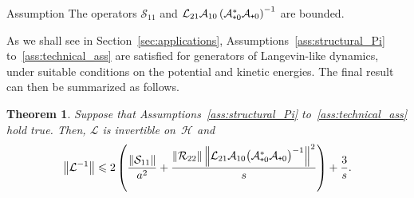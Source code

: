 \documentclass[10pt]{amsart}
\newtheorem{theo}{Theorem}[section]
\theoremstyle{definition}\newtheorem{defi}[theo]{Definition}\newtheorem{rema}[theo]{Remark}\newtheorem{exam}[theo]{Example}\newtheorem{exem}[theo]{Example}\newtheorem{nota}[theo]{Notation}
\newcommand{\cL}{\mathcal{L}}
\newcommand{\cLs}{\mathcal{S}}
\newcommand{\cLa}{\mathcal{A}}
\newcommand{\cR}{\mathcal{R}}
\newcommand{\cH}{\mathcal{H}}
\newcommand{\subplus}{\textnormal{\texttt{+}}}
\renewcommand{\leq}{\leqslant}
\begin{document}
\begin{enonce}{Assumption}\label{ass:technical_ass}
The operators $\cLs_{11}$ and $\cL_{21}\cLa_{10}\left(\cLa_{\subplus0}^* \cLa_{\subplus0}\right)^{-1}$ are bounded.
\end{enonce}

As we shall see in Section~\ref{sec:applications}, Assumptions~\ref{ass:structural_Pi} to~\ref{ass:technical_ass} are satisfied for generators of Langevin-like dynamics, under suitable conditions on the potential and kinetic energies. The final result can then be summarized as follows.


\begin{theo}\label{thm:bounds_Linv}
Suppose that Assumptions~\ref{ass:structural_Pi} to~\ref{ass:technical_ass} hold true. Then, $\cL$ is invertible on~$\cH$ and
\[
\left\|\cL^{-1}\right\| \leq 2\left(\frac {\left\|\cLs_{11}\right\|} {a^{2}} + \frac {\left\|\cR_{22}\right\|\left\|\cL_{21}\cLa_{10}\big(\cLa_{\subplus0}^{*}\cLa_{\subplus0}\big)^{-1}\right\|^{2}}{s} \right) + \frac3s.
\]
\end{theo}
\end{document}
